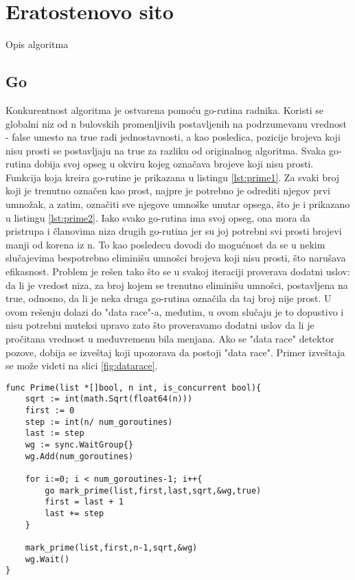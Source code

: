 \documentclass[12pt,oneside]{memoir}
\begin{document}

\section{Eratostenovo sito}
Opis algoritma

\subsection{Go}

Konkurentnost algoritma je ostvarena  pomoću go-rutina radnika. Koristi se globalni niz od n bulovskih promenljivih postavljenih na podrzumevanu vrednost - false umesto na true radi jednostavnosti, a kao posledica, pozicije brojeva koji nisu prosti se postavljaju na true za razliku od originalnog algoritma. Svaka go-rutina dobija svoj opseg u okviru kojeg označava brojeve koji nisu prosti. Funkcija koja kreira go-rutine je prikazana u listingu \ref{lst:prime1}. Za svaki broj koji je trenutno označen kao prost, najpre je potrebno je odrediti njegov prvi umnožak, a zatim, označiti sve njegove umnoške unutar opsega, što je i prikazano u listingu \ref{lst:prime2}. Iako svako go-rutina ima svoj opseg, ona mora da pristrupa i članovima niza drugih go-rutina jer su joj potrebni svi prosti brojevi manji od korena iz n. To kao posledecu dovodi do mogućnost da se u nekim slučajevima bespotrebno eliminišu umnošci brojeva koji nisu prosti, što narušava efikasnost. Problem je rešen tako što se u svakoj iteraciji proverava dodatni uslov: da li je vredost niza, za broj kojem se trenutno eliminišu umnošci, postavljena na true, odnosno, da li je neka druga go-rutina označila da taj broj nije prost. U ovom rešenju dolazi do "data race"-a, međutim, u ovom slučaju je to dopustivo i nisu potrebni muteksi upravo zato što proveravamo dodatni uslov da li je pročitana vrednost u međuvremenu bila menjana. Ako se "data race"  detektor pozove, dobija se izveštaj koji upozorava da postoji "data race". Primer izveštaja se može videti na slici \ref{fig:datarace}. 

\begin{center}
\begin{lstlisting}[caption=Go implementacija konkurentne funkcije za određivanje prostih brojeva manjih od n,label={lst:prime1},float, backgroundcolor=\color{background}]
func Prime(list *[]bool, n int, is_concurrent bool){
	sqrt := int(math.Sqrt(float64(n)))
	first := 0
	step := int(n/ num_goroutines)
	last := step
	wg := sync.WaitGroup{}
	wg.Add(num_goroutines)

	for i:=0; i < num_goroutines-1; i++{
		go mark_prime(list,first,last,sqrt,&wg,true)
		first = last + 1
		last += step
	}

	mark_prime(list,first,n-1,sqrt,&wg)
	wg.Wait()
}
\end{lstlisting}
\end{center}
\end{document}
